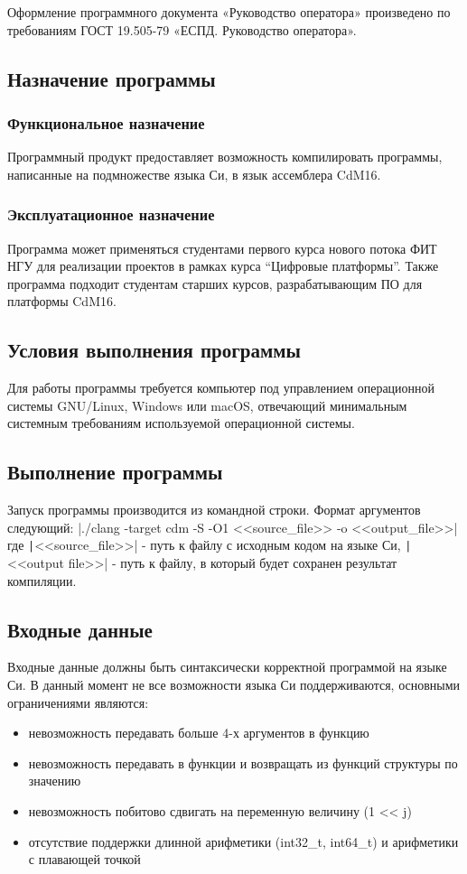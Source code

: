 \documentclass[a4paper,14pt]{extarticle}
\begin{document}
Оформление программного документа «Руководство оператора» произведено по требованиям ГОСТ 19.505-79 «ЕСПД. Руководство оператора». 
	
\subsection{Назначение программы}
\subsubsection{Функциональное назначение}
Программный продукт предоставляет возможность компилировать программы, написанные на подмножестве языка Си, в язык ассемблера CdM16.
\subsubsection{Эксплуатационное назначение}
Программа может применяться студентами первого курса нового потока ФИТ НГУ для реализации проектов в рамках курса “Цифровые платформы”. Также программа подходит студентам старших курсов, разрабатывающим ПО для платформы CdM16.
\subsection{Условия выполнения программы}
Для работы программы требуется компьютер под управлением операционной системы GNU/Linux, Windows или macOS, отвечающий минимальным системным требованиям используемой операционной системы.
\subsection{Выполнение программы}
Запуск программы производится из командной строки. Формат аргументов следующий:
|./clang -target cdm -S -O1 <<source_file>> -o <<output_file>>|
где \texttt|<<source_file>>| - путь к файлу с исходным кодом на языке Си, \texttt|<<output file>>| - путь к файлу, в который будет сохранен результат компиляции.
\subsection{Входные данные}
Входные данные должны быть синтаксически корректной программой на языке Си. В данный момент не все возможности языка Си поддерживаются, основными ограничениями являются:
\begin{itemize}
\item невозможность передавать больше 4-х аргументов в функцию
\item невозможность передавать в функции и возвращать из функций структуры по значению
\item невозможность побитово сдвигать на переменную величину (1 << j)
\item отсутствие поддержки длинной арифметики (int32\_t, int64\_t) и арифметики с плавающей точкой
\end{itemize}
\end{document}
